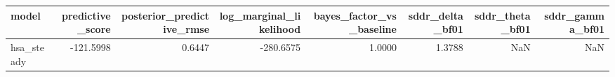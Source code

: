 \begin{tabular}{lrrrrrrr}
\toprule
model & predictive\_score & posterior\_predictive\_rmse & log\_marginal\_likelihood & bayes\_factor\_vs\_baseline & sddr\_delta\_bf01 & sddr\_theta\_bf01 & sddr\_gamma\_bf01 \\
\midrule
hsa\_steady & -121.5998 & 0.6447 & -280.6575 & 1.0000 & 1.3788 & NaN & NaN \\
\bottomrule
\end{tabular}
